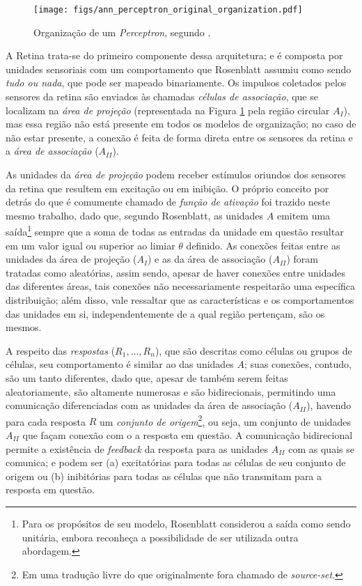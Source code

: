 \begin{figure}[H]
    \centering
    \texttt{[image: figs/ann\_perceptron\_original\_organization.pdf]}
    \caption{Organização de um \textit{Perceptron}, segundo \citep{rosenblatt1958perceptron}.}
    \label{fig:ann_perceptron_organization}
\end{figure}

A Retina trata-se do primeiro componente dessa arquitetura; e é composta por unidades sensoriais com um comportamento que Rosenblatt assumiu como sendo \textit{tudo ou nada}, que pode ser mapeado binariamente. Os impulsos coletados pelos sensores da retina são enviados às chamadas \textit{células de associação}, que se localizam na \textit{área de projeção} (representada na Figura \ref{fig:ann_perceptron_organization} pela região circular $A_{I}$), mas essa região não está presente em todos os modelos de organização; no caso de não estar presente, a conexão é feita de forma direta entre os sensores da retina e a \textit{área de associação} ($A_{II}$).

As unidades da \textit{área de projeção} podem receber estímulos oriundos dos sensores da retina que resultem em excitação ou em inibição. O próprio conceito por detrás do que é comumente chamado de \textit{função de ativação} foi trazido neste mesmo trabalho, dado que, segundo Rosenblatt, as unidades $A$ emitem uma saída\footnote{Para os propósitos de seu modelo, Rosenblatt considerou a saída como sendo unitária, embora reconheça a possibilidade de ser utilizada outra abordagem.} sempre que a soma de todas as entradas da unidade em questão resultar em um valor igual ou superior ao limiar $\theta$ definido. As conexões feitas entre as unidades da área de projeção ($A_{I}$) e as da área de associação ($A_{II}$) foram tratadas como aleatórias, assim sendo, apesar de haver conexões entre unidades das diferentes áreas, tais conexões não necessariamente respeitarão uma específica distribuição; além disso, vale ressaltar que as características e os comportamentos das unidades em si, independentemente de a qual região pertençam, são os mesmos.

A respeito das \textit{respostas} ($R_{1}, \dots, R_{n}$), que são descritas como células ou grupos de células, seu comportamento é similar ao das unidades $A$; suas conexões, contudo, são um tanto diferentes, dado que, apesar de também serem feitas aleatoriamente, são altamente numerosas e são bidirecionais, permitindo uma comunicação diferenciadas com as unidades da área de associação ($A_{II}$), havendo para cada resposta $R$ um \textit{conjunto de origem}\footnote{Em uma tradução livre do que originalmente fora chamado de \textit{source-set}.}, ou seja, um conjunto de unidades $A_{II}$ que façam conexão com o a resposta em questão. A comunicação bidirecional permite a existência de \textit{feedback} da resposta para as unidades $A_{II}$ com as quais se comunica; e podem ser (a) excitatórias para todas as células de seu conjunto de origem ou (b) inibitórias para todas as células que não transmitam para a resposta em questão.

